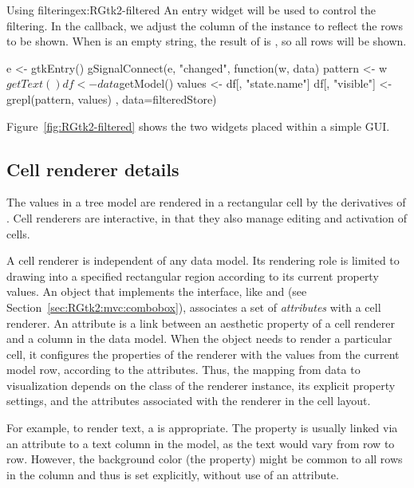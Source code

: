 \begin{example}{Using filtering}{ex:RGtk2-filtered}
An entry widget will be used to control the filtering. In the
callback, we adjust the  column of the
 instance to reflect the rows to be shown. When
 is an empty string, the result of  is 
, so all rows will be shown.
\begin{Schunk}
\begin{Sinput}
 e <- gtkEntry()
 gSignalConnect(e, "changed", function(w, data) {
   pattern <- w$getText()
   df <- data$getModel()
   values <- df[, "state.name"]
   df[, "visible"] <- grepl(pattern, values)
 }, data=filteredStore)
\end{Sinput}
\end{Schunk}


Figure~\ref{fig:RGtk2-filtered} shows the two widgets placed within a
simple GUI.
\end{example}

\subsection{Cell renderer details}
\label{sec:RGtk2:cellrenderers}

The values in a tree model are rendered in a rectangular cell by the
derivatives of . Cell renderers are
interactive, in that they also manage editing and activation of cells.

A cell renderer is independent of any data model. Its rendering role
is limited to drawing into a specified rectangular region according to
its current property values. An object that implements the
 interface, like  and
 (see Section~\ref{sec:RGtk2:mvc:combobox}),
associates a set of \emph{attributes} with a cell renderer. An
attribute is a link between an aesthetic property of a cell renderer
and a column in the data model. When the  object
needs to render a particular cell, it configures the properties of the
renderer with the values from the current model row, according to the
attributes. Thus, the mapping from data to visualization depends on
the class of the renderer instance, its explicit property settings,
and the attributes associated with the renderer in the cell layout.

For example, to render text, a  is
appropriate. The  property is usually linked via an
attribute to a text column in the model, as the text would vary from
row to row. However, the background color (the 
property) might be common to all rows in the column and thus is set
explicitly, without use of an attribute.

